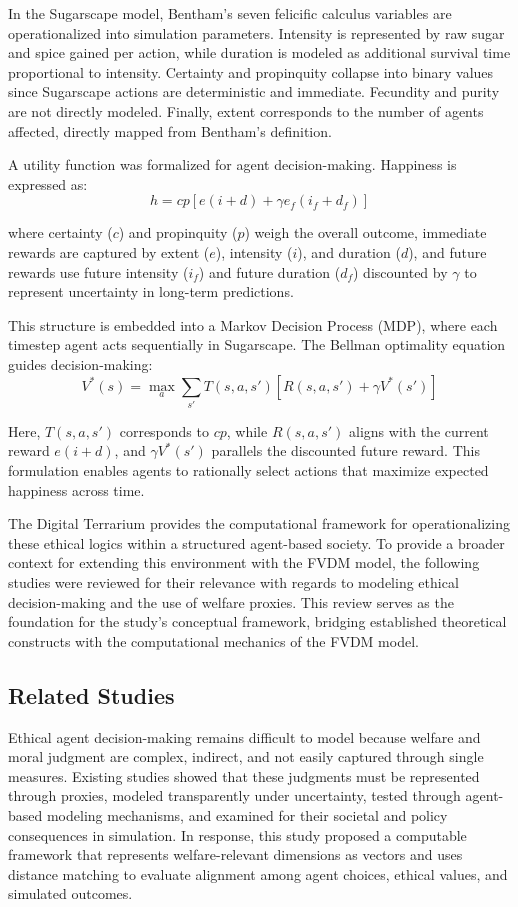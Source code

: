 \documentclass{icsthesis}
\begin{document}
\begin{mainmatter}
In the Sugarscape model, Ben\-tham’s seven fe\-li\-ci\-fic calculus variables are op\-er\-a\-tion\-al\-ized into simulation parameters. Intensity is represented by raw sugar and spice gained per action, while duration is modeled as additional survival time proportional to intensity. Certainty and pro\-pin\-qui\-ty collapse into binary values since Sugarscape actions are de\-ter\-mi\-nis\-tic and immediate. Fecundity and purity are not directly modeled. Finally, extent corresponds to the number of agents affected, directly mapped from Bentham’s definition.

A utility function was formalized for agent decision-making. Happiness is expressed as:
\[ h = cp \left[ e(i+d) + \gamma e_f(i_f+d_f) \right] \]

where certainty ($c$) and propinquity ($p$) weigh the overall outcome, immediate rewards are captured by extent ($e$), intensity ($i$), and duration ($d$), and future rewards use future intensity ($i_f$) and future duration ($d_f$) discounted by $\gamma$ to represent uncertainty in long-term predictions.

This structure is embedded into a Markov Decision Process (MDP), where each timestep agent acts sequentially in Sugarscape. The Bellman optimality equation guides decision-making:
\[ V^{*}(s) = \max_{a} \sum_{s'} T(s,a,s') \left[ R(s,a,s') + \gamma V^{*}(s') \right] \]

Here, $T(s,a,s')$ corresponds to $cp$, while $R(s,a,s')$ aligns with the current reward $e(i+d)$, and $\gamma V^*(s')$ parallels the discounted future reward. This formulation enables agents to rationally select actions that maximize expected happiness across time.

The Digital Terrarium provides the computational framework for operationalizing these ethical logics within a structured agent-based society. To provide a broader context for extending this environment with the FVDM model, the following studies were reviewed for their relevance with regards to modeling ethical decision-making and the use of welfare proxies. This review serves as the foundation for the study’s conceptual framework, bridging established theoretical constructs with the computational mechanics of the FVDM model.

			\subsection{Related Studies}
Ethical agent decision-making remains difficult to model because welfare and moral judgment are complex, indirect, and not easily captured through single measures. Existing studies showed that these judgments must be represented through proxies, modeled transparently under uncertainty, tested through agent-based modeling mechanisms, and examined for their societal and policy consequences in simulation. In response, this study proposed a computable framework that represents welfare-relevant dimensions as vectors and uses distance matching to evaluate alignment among agent choices, ethical values, and simulated outcomes.


\end{mainmatter}
\end{document}
